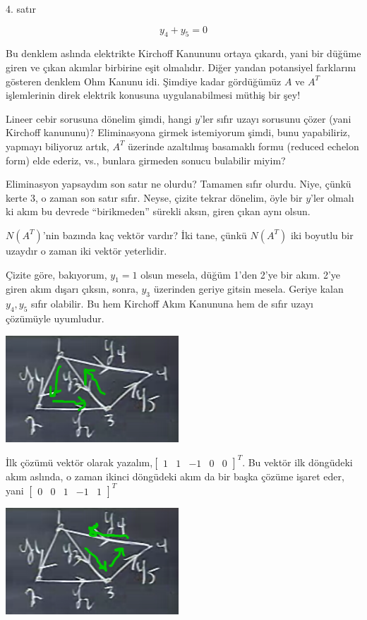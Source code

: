 \documentclass[12pt,fleqn]{article}\usepackage{../../common}
\begin{document}
4. satır

$$ y_4 + y_5 = 0 $$

Bu denklem aslında elektrikte Kirchoff Kanununu ortaya çıkardı, yani bir
düğüme giren ve çıkan akımlar birbirine eşit olmalıdır. Diğer yandan
potansiyel farklarını gösteren denklem Ohm Kanunu idi. Şimdiye kadar
gördüğümüz $A$ ve $A^T$ işlemlerinin direk elektrik konusuna
uygulanabilmesi müthiş bir şey! 

Lineer cebir sorusuna dönelim şimdi, hangi $y$'ler sıfır uzayı sorusunu
çözer (yani Kirchoff kanununu)? Eliminasyona girmek istemiyorum şimdi, bunu
yapabiliriz, yapmayı biliyoruz artık, $A^T$ üzerinde azaltılmış basamaklı
formu (reduced echelon form) elde ederiz, vs., bunlara girmeden sonucu
bulabilir miyim?

Eliminasyon yapsaydım son satır ne olurdu? Tamamen sıfır olurdu. Niye,
çünkü kerte 3, o zaman son satır sıfır. Neyse, çizite tekrar dönelim, öyle
bir $y$'ler olmalı ki akım bu devrede ``birikmeden'' sürekli aksın, giren
çıkan aynı olsun.

$N(A^T)$'nin bazında kaç vektör vardır? İki tane, çünkü $N(A^T)$ iki
boyutlu bir uzaydır o zaman iki vektör yeterlidir. 

Çizite göre, bakıyorum, $y_1=1$ olsun mesela, düğüm 1'den 2'ye bir
akım. 2'ye giren akım dışarı çıksın, sonra, $y_3$ üzerinden geriye gitsin
mesela. Geriye kalan $y_4,y_5$ sıfır olabilir. Bu hem Kirchoff Akım
Kanununa hem de sıfır uzayı çözümüyle uyumludur.

\includegraphics[height=4cm]{12_4.png}

İlk çözümü vektör olarak yazalım,$\left[\begin{array}{ccccc}1&1&-1&0&0 \end{array}\right]^T$. 
Bu vektör ilk döngüdeki akım aslında, o zaman  ikinci döngüdeki akım da bir başka çözüme 
işaret eder, yani $\left[\begin{array} {ccccc}0&0&1&-1&1 \end{array}\right]^T$

\includegraphics[height=4cm]{12_5.png}
\end{document}
